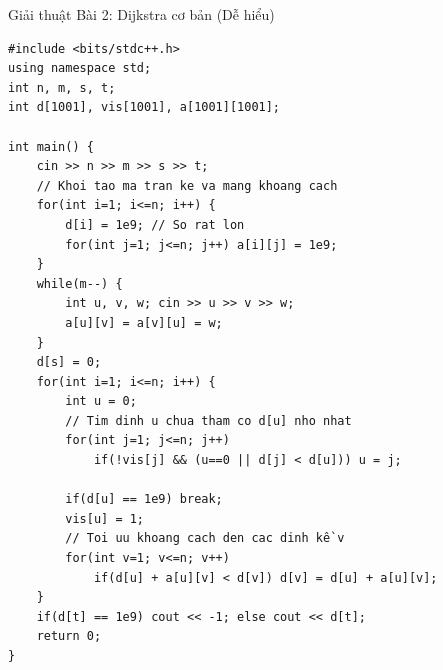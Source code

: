 \documentclass[10pt, xcolor={dvipsnames}]{beamer}
\begin{document}
\begin{frame}[fragile]{Giải thuật Bài 2: Dijkstra cơ bản (Dễ hiểu)}
\begin{lstlisting}
#include <bits/stdc++.h>
using namespace std;
int n, m, s, t;
int d[1001], vis[1001], a[1001][1001];

int main() {
    cin >> n >> m >> s >> t;
    // Khoi tao ma tran ke va mang khoang cach
    for(int i=1; i<=n; i++) {
        d[i] = 1e9; // So rat lon
        for(int j=1; j<=n; j++) a[i][j] = 1e9;
    }
    while(m--) {
        int u, v, w; cin >> u >> v >> w;
        a[u][v] = a[v][u] = w;
    }
    d[s] = 0;
    for(int i=1; i<=n; i++) {
        int u = 0;
        // Tim dinh u chua tham co d[u] nho nhat
        for(int j=1; j<=n; j++)
            if(!vis[j] && (u==0 || d[j] < d[u])) u = j;
        
        if(d[u] == 1e9) break;
        vis[u] = 1;
        // Toi uu khoang cach den cac dinh kề v
        for(int v=1; v<=n; v++)
            if(d[u] + a[u][v] < d[v]) d[v] = d[u] + a[u][v];
    }
    if(d[t] == 1e9) cout << -1; else cout << d[t];
    return 0;
}
\end{lstlisting}
\end{frame}
\end{document}

